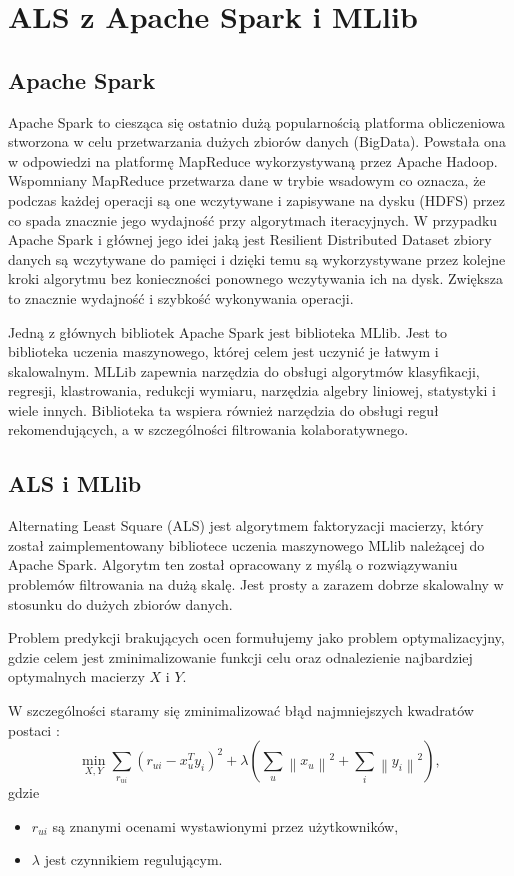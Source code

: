 \documentclass[12pt,a4paper]{report}
\newcommand{\norm}[2][]{\left\| {#2} \right\|_{#1}}
\begin{document}
\section{ALS z Apache Spark i MLlib}
\subsection{Apache Spark}
Apache Spark to ciesząca się ostatnio dużą popularnością platforma obliczeniowa stworzona w celu przetwarzania dużych zbiorów danych (BigData). Powstała ona w odpowiedzi na platformę MapReduce wykorzystywaną przez Apache Hadoop. Wspomniany MapReduce przetwarza dane w trybie wsadowym co oznacza, że podczas każdej operacji są one wczytywane i zapisywane na dysku (HDFS) przez co spada znacznie jego wydajność przy algorytmach iteracyjnych. W przypadku Apache Spark i głównej jego idei jaką jest 
Resilient Distributed Dataset zbiory danych są wczytywane do pamięci i dzięki temu są wykorzystywane przez kolejne kroki algorytmu bez konieczności ponownego wczytywania ich na dysk. Zwiększa to znacznie wydajność i szybkość wykonywania operacji.

Jedną z głównych bibliotek Apache Spark jest biblioteka MLlib. Jest to biblioteka uczenia maszynowego, której celem jest uczynić je łatwym i skalowalnym. MLLib zapewnia narzędzia do obsługi algorytmów klasyfikacji, regresji, klastrowania, redukcji wymiaru, narzędzia algebry liniowej, statystyki i wiele innych. Biblioteka ta wspiera również narzędzia do obsługi reguł rekomendujących, a w szczególności filtrowania kolaboratywnego.

\subsection{ALS i MLlib}
Alternating Least Square (ALS) jest algorytmem faktoryzacji macierzy, który został zaimplementowany bibliotece uczenia maszynowego MLlib należącej do Apache Spark. Algorytm ten został opracowany z myślą o rozwiązywaniu problemów filtrowania na dużą skalę. Jest prosty a zarazem dobrze skalowalny w stosunku do dużych zbiorów danych.

Problem predykcji brakujących ocen formułujemy jako problem optymalizacyjny, gdzie celem jest zminimalizowanie funkcji celu oraz odnalezienie najbardziej optymalnych macierzy $X$ i $Y$. 

W szczególności staramy się zminimalizować błąd najmniejszych kwadratów postaci {\citep{mcvals}}:
$$
\min_{X,Y} \sum_{r_{ui}} (r_{ui} - x_u^Ty_i)^2 + \lambda (\sum_u \norm{x_u}^2 + \sum_i \norm{y_i}^2),
$$
gdzie 
\begin{itemize}
\item $r_{ui}$ są znanymi ocenami wystawionymi przez użytkowników,
\item $\lambda$ jest czynnikiem regulującym.
\end{itemize}
\end{document}
